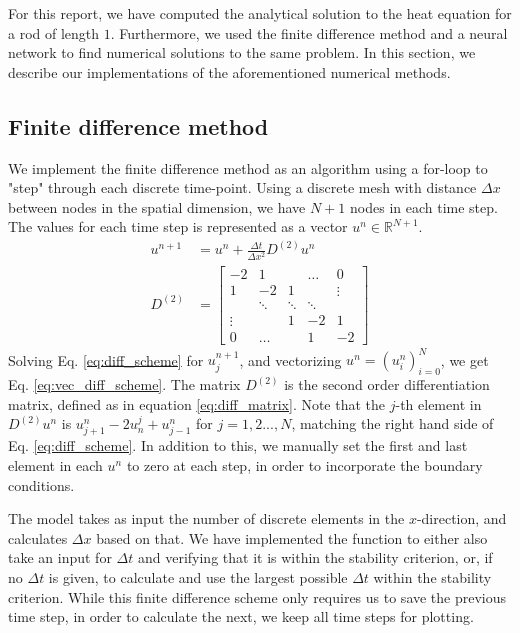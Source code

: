 For this report, we have computed the analytical solution to the heat equation for a rod of length $1$. 
Furthermore, we used the finite difference method and a neural network to find numerical solutions to the same problem. 
In this section, we describe our implementations of the aforementioned numerical methods. 

\subsection{Finite difference method}

We implement the finite difference method as an algorithm using a for-loop to "step" through each discrete time-point.
Using a discrete mesh with distance $\Delta x$ between nodes in the spatial dimension,
we have $N+1$ nodes in each time step.
The values for each time step is represented as a vector $u^n \in \mathbb{R}^{N+1}$.
\begin{align}
    \label{eq:vec_diff_scheme}
    u^{n+1} &= u^n + \frac{\Delta t}{\Delta x^2} D^{(2)}u^n \\
    \label{eq:diff_matrix}
    D^{(2)} &= 
    \begin{bmatrix}
    -2  & 1     &       &    \dots    &   0    \\
     1 & -2 & 1 &  &    \vdots    \\
     & \ddots & \ddots & \ddots & \\
     \vdots &     & 1 & -2 & 1 \\
     0&     \dots      &      & 1     & -2
    \end{bmatrix}
\end{align}
Solving Eq. \ref{eq:diff_scheme} for $u_j^{n+1}$, and vectorizing $u^n = (u^n_i)_{i=0}^N$, we get Eq. \ref{eq:vec_diff_scheme}.
The matrix $D^{(2)}$ is the second order differentiation matrix, defined as in equation \ref{eq:diff_matrix}.
Note that the $j$-th element in $D^{(2)}u^n$ is $u_{j+1}^n - 2u_n^j + u_{j-1}^n$ for $j = 1,2...,N$, matching the right hand side of Eq. \ref{eq:diff_scheme}.
In addition to this, we manually set the first and last element in each $u^n$ to zero at each step, in order to incorporate the boundary conditions.

The model takes as input the number of discrete elements in the $x$-direction, and calculates $\Delta x$ based on that.
We have implemented the function to either also take an input for $\Delta t$ and verifying that it is within the stability criterion, or, if no $\Delta t$ is given, to calculate and use the largest possible $\Delta t$ within the stability criterion.
While this finite difference scheme only requires us to save the previous time step, in order to calculate the next, we keep all time steps for plotting.

